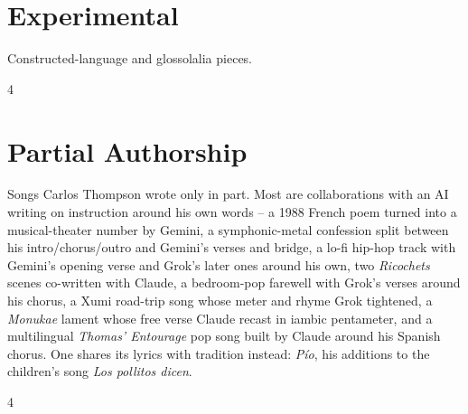 \documentclass[a4paper,landscape]{memoir}
\begin{document}
\chapter{Experimental}
Constructed-language and glossolalia pieces.
\clearpage\begin{multicols*}{4}











\end{multicols*}

\chapter{Partial Authorship}
Songs Carlos Thompson wrote only in part. Most are collaborations with an AI writing on instruction around his own words -- a 1988 French poem turned into a musical-theater number by Gemini, a symphonic-metal confession split between his intro/chorus/outro and Gemini's verses and bridge, a lo-fi hip-hop track with Gemini's opening verse and Grok's later ones around his own, two \emph{Ricochets} scenes co-written with Claude, a bedroom-pop farewell with Grok's verses around his chorus, a Xumi road-trip song whose meter and rhyme Grok tightened, a \emph{Monukae} lament whose free verse Claude recast in iambic pentameter, and a multilingual \emph{Thomas' Entourage} pop song built by Claude around his Spanish chorus. One shares its lyrics with tradition instead: \emph{Pío}, his additions to the children's song \emph{Los pollitos dicen}.
\clearpage\begin{multicols*}{4}












\end{multicols*}
\end{document}
